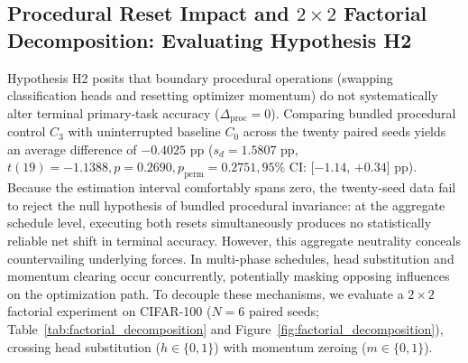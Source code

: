 \documentclass[sn-mathphys,Numbered]{sn-jnl}
\begin{document}
\subsection{Procedural Reset Impact and \texorpdfstring{$2 \times 2$}{2x2} Factorial Decomposition: Evaluating Hypothesis H2}\label{subsec:results_procedural}

Hypothesis H2 posits that boundary procedural operations (swapping classification heads and resetting optimizer momentum) do not systematically alter terminal primary-task accuracy ($\Delta_{\mathrm{proc}} = 0$). Comparing bundled procedural control $C_3$ with uninterrupted baseline $C_0$ across the twenty paired seeds yields an average difference of $-0.4025$ pp ($s_d = 1.5807$ pp, $t(19) = -1.1388, p = 0.2690, p_{\mathrm{perm}} = 0.2751, 95\%$ CI: [$-1.14$, $+0.34$] pp). Because the estimation interval comfortably spans zero, the twenty-seed data fail to reject the null hypothesis of bundled procedural invariance: at the aggregate schedule level, executing both resets simultaneously produces no statistically reliable net shift in terminal accuracy. However, this aggregate neutrality conceals countervailing underlying forces. In multi-phase schedules, head substitution and momentum clearing occur concurrently, potentially masking opposing influences on the optimization path. To decouple these mechanisms, we evaluate a $2 \times 2$ factorial experiment on CIFAR-100 ($N = 6$ paired seeds; Table~\ref{tab:factorial_decomposition} and Figure~\ref{fig:factorial_decomposition}), crossing head substitution ($h \in \{0, 1\}$) with momentum zeroing ($m \in \{0, 1\}$).
\end{document}
